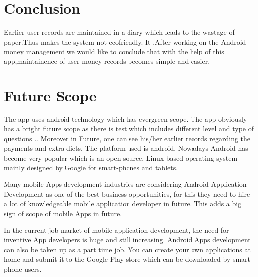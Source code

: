\section{Conclusion}
Earlier user records are maintained in a diary which leads to the wastage of
paper.Thus makes the system not ecofriendly. It .After working on the Android
money management we would like to conclude that with the help of this
app,maintainence of user money records becomes simple and easier. \\

 
\section{Future Scope}
The app uses android technology which has evergreen scope. The app obviously
has a bright future scope as there is test which includes different level and type of
questions .. Moreover in Future, one can see his/her earlier records regarding the
payments and extra diets. The platform used is android. Nowadays Android has
become very popular which is an open-source, Linux-based operating system
mainly designed by Google for smart-phones and tablets.

Many mobile Apps development industries are considering Android Application
Development as one of the best business opportunities, for this they need to
hire a lot of knowledgeable mobile application developer in future. This adds a
big sign of scope of mobile Apps in future.

In the current job market of mobile application development, the need for inventive
App developers is huge and still increasing. Android Apps development can also
be taken up as a part time job. You can create your own applications at home and
submit it to the Google Play store which can be downloaded by smart-phone users.